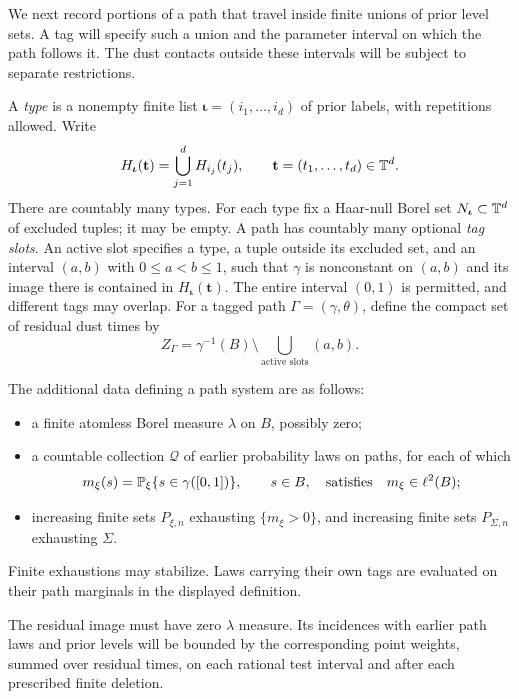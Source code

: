 We next record portions of a path that travel inside finite unions of
prior level sets.  A tag will specify such a union and the parameter
interval on which the path follows it.  The dust contacts outside
these intervals will be subject to separate restrictions.

A \emph{type} is a nonempty finite list
$\boldsymbol\iota=(i_1,\ldots,i_d)$ of prior labels, with repetitions
allowed.  Write
\[
 H_{\boldsymbol\iota}(\mathbf t)
   =\bigcup_{j=1}^d H_{i_j}(t_j),
 \qquad \mathbf t=(t_1,\ldots,t_d)\in\mathbb T^d.
\]
There are countably many types.  For each type fix a Haar-null Borel
set $N_{\boldsymbol\iota}\subset\mathbb T^d$ of excluded tuples; it may be
empty.  A path has countably many optional \emph{tag slots}.  An active
slot specifies a type, a tuple outside its excluded set, and an interval
$(a,b)$ with $0\le a<b\le1$, such that $\gamma$ is nonconstant on
$(a,b)$ and its image there is contained in
$H_{\boldsymbol\iota}(\mathbf t)$.  The entire interval $(0,1)$ is
permitted, and different tags may overlap.  For a tagged path
$\Gamma=(\gamma,\theta)$, define the compact set of residual dust times
by
\[
 Z_\Gamma
   =\gamma^{-1}(B)\setminus
       \bigcup_{\text{active slots}}(a,b).
\]

The additional data defining a path system are as follows:
\begin{itemize}
\item a finite atomless Borel measure $\lambda$ on $B$, possibly zero;
\item a countable collection $\mathscr Q$ of earlier probability laws
on paths, for each of which
\[
 m_\xi(s)=\operatorname{\mathbb P}_\xi\{s\in\gamma([0,1])\},\qquad s\in B,
 \quad\text{satisfies}\quad m_\xi\in\ell^2(B);
\]
\item increasing finite sets $P_{\xi,n}$ exhausting
$\{m_\xi>0\}$, and increasing finite sets $P_{\Sigma,n}$ exhausting
$\Sigma$.
\end{itemize}
Finite exhaustions may stabilize.  Laws carrying their own tags are
evaluated on their path marginals in the displayed definition.

The residual image must have zero $\lambda$ measure.  Its incidences
with earlier path laws and prior levels will be bounded by the
corresponding point weights, summed over residual times, on each
rational test interval and after each prescribed finite deletion.

